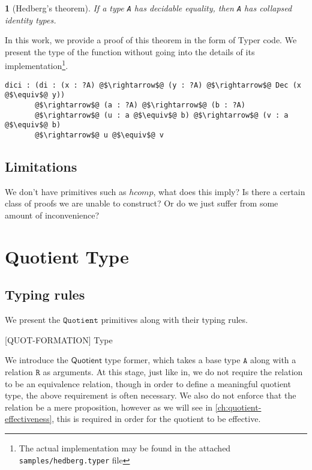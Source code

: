 \documentclass[12pt,twoside,maitrise]{dms}
\newtheorem{theo}[cor]{\theoremname}
\theoremstyle{definition}
\numberwithin{equation}{section}
\numberwithin{table}{chapter}
\numberwithin{figure}{chapter}
\newcommand\kw[1] {\textsf{#1}}
\newcommand\id[1] {\texttt{#1}}
\newcommand\fn[1] {\texttt{#1}}
\begin{document}
\begin{theo}[Hedberg's theorem\cite{hedberg1998coherence}]
If a type \fn{A} has decidable equality, then \fn{A} has collapsed identity
types.
\end{theo}

In this work, we provide a proof of this theorem in the form of Typer code. We
present the type of the function without going into the details of its
implementation\footnote{The actual implementation may be found in the attached \fn{samples/hedberg.typer} file}.

\begin{verbatim}
dici : (di : (x : ?A) @$\rightarrow$@ (y : ?A) @$\rightarrow$@ Dec (x @$\equiv$@ y))
       @$\rightarrow$@ (a : ?A) @$\rightarrow$@ (b : ?A)
       @$\rightarrow$@ (u : a @$\equiv$@ b) @$\rightarrow$@ (v : a @$\equiv$@ b)
       @$\rightarrow$@ u @$\equiv$@ v
\end{verbatim}

\section{Limitations}
We don't have primitives such as $hcomp$, what does this imply? Is there a
certain class of proofs we are unable to construct? Or do we just suffer from
some amount of inconvenience?


\chapter{Quotient Type}
\section{Typing rules}
We present the $\id{Quotient}$ primitives along with their typing rules.

\begin{prooftree*}
   \hypo{\oftype{\ctx}{\id{A}}{\kw{Type}}}
   \hypo{\oftype{\ctx}{\id{R}}{\id{A} \rightarrow \id{A} \rightarrow \kw{Type}}}
   [\kw{QUOT-FORMATION}]{\oftype{\ctx}{\Funapp{\kw{Quotient}}{\id{A}}{\id{R}}}
                                             {\kw{Type}}}
\end{prooftree*}

We introduce the $\kw{Quotient}$ type former, which takes a base type $\id{A}$
along with a relation $\id{R}$ as arguments. At this stage, just like
in\cite{hofmann1995simple}, we do not require the relation to be an equivalence
relation, though in order to define a meaningful quotient type, the above
requirement is often necessary. We also do not enforce that the relation be a
mere proposition, however as we will see in \autoref{ch:quotient-effectiveness},
this is required in order for the quotient to be effective.
\end{document}
